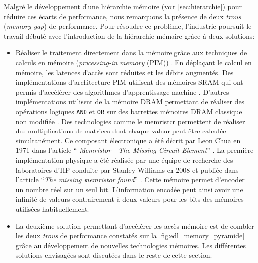         Malgré le développement d'une hiérarchie mémoire (voir \autoref{sec:hierarchie}) pour réduire ces écarts de performance, nous remarquons  la présence de deux \textit{trous} (\textit{memory gap}) de performance. Pour résoudre ce problème, l'industrie poursuit le travail débuté avec l'introduction de la hiérarchie mémoire grâce à deux solutions: 
        \begin{itemize}
            \item Réaliser le traitement directement dans la mémoire grâce aux techniques de calculs en mémoire (\textit{processing-in memory} (PIM)) \cite{Singh2019}. En déplaçant le calcul en mémoire, les latences d'accès sont réduites et les débits augmentés. Des implémentations d'architecture PIM utilisent des mémoires SRAM qui ont permis d'accélérer des algorithmes d'apprentissage machine \cite{Zhang2016, Biswas2018, Kang2018}. D'autres implémentations utilisent de la mémoire DRAM \cite{Seshadri2017} \cite{Li2017} permettant de réaliser des opérations logiques \verb|AND| et \verb|OR| sur des  barrettes mémoires DRAM classique non modifiée \cite{Gao2019}. Des technologies comme le memristor permettent de réaliser des multiplications de matrices dont chaque valeur peut être calculée simultanément. Ce composant électronique a été décrit par Leon Chua en 1971 dans l'article ``\textit{ Memristor - The Missing Circuit Element}''  \cite{Chua1971}. La première implémentation physique a été réalisée par une équipe de recherche des laboratoires d'HP conduite par Stanley Williams en 2008 et publiée dans l'article ``\textit{The missing memristor found}'' \cite{Strukov2008}. Cette mémoire permet d'encoder un nombre réel sur un seul bit. L'information encodée peut ainsi avoir une infinité de valeurs contrairement à deux valeurs pour les bits des mémoires utilisées habituellement.
            
            \item La deuxième solution permettant d'accélérer les accès mémoire est de combler les deux \textit{trous} de performance constatés sur la \autoref{fig:edl_memory_pyramide} grâce au développement de nouvelles technologies mémoires. Les différentes solutions envisagées sont discutées dans le reste de cette section.
        \end{itemize}
        
        
    
    
